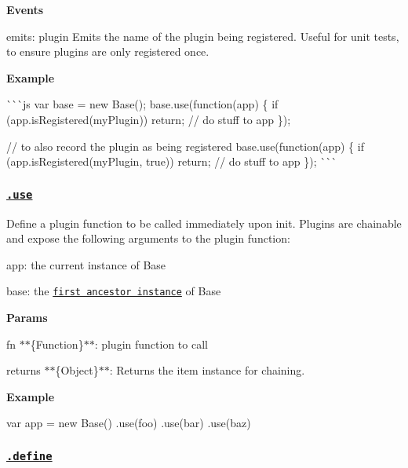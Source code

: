{\bfseries Events}


\begin{DoxyItemize}
\item {\ttfamily emits}\+: {\ttfamily plugin} Emits the name of the plugin being registered. Useful for unit tests, to ensure plugins are only registered once.
\end{DoxyItemize}

{\bfseries Example}

\`{}\`{}\`{}js var base = new Base(); base.\+use(function(app) \{ if (app.\+is\+Registered(\textquotesingle{}my\+Plugin\textquotesingle{})) return; // do stuff to {\ttfamily app} \});

// to also record the plugin as being registered base.\+use(function(app) \{ if (app.\+is\+Registered(\textquotesingle{}my\+Plugin\textquotesingle{}, true)) return; // do stuff to {\ttfamily app} \}); \`{}\`{}\`{}

\subsubsection*{\href{index.js#L175}{\tt .use}}

Define a plugin function to be called immediately upon init. Plugins are chainable and expose the following arguments to the plugin function\+:


\begin{DoxyItemize}
\item {\ttfamily app}\+: the current instance of {\ttfamily Base}
\item {\ttfamily base}\+: the \href{#base}{\tt first ancestor instance} of {\ttfamily Base}
\end{DoxyItemize}

{\bfseries Params}


\begin{DoxyItemize}
\item {\ttfamily fn} $\ast$$\ast$\{Function\}$\ast$$\ast$\+: plugin function to call
\item {\ttfamily returns} $\ast$$\ast$\{Object\}$\ast$$\ast$\+: Returns the item instance for chaining.
\end{DoxyItemize}

{\bfseries Example}


\begin{DoxyCode}
var app = new Base()
  .use(foo)
  .use(bar)
  .use(baz)
\end{DoxyCode}


\subsubsection*{\href{index.js#L197}{\tt .define}}


